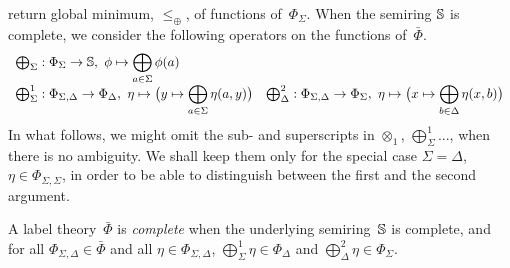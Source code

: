 return global minimum, \wrt $\leq_\oplus$, of functions of~$\Phi_\Sigma$.
%
When the semiring $\mathbb{S}$ is complete, we
consider the following operators on the functions of~$\bar\Phi$. %
\[
\begin{array}{ll}
\bigoplus_\Sigma : \Phi_\Sigma \to \mathbb{S},\
  \phi \mapsto \displaystyle\bigoplus_{a \in \Sigma} \phi(a)\\
\bigoplus^1_\Sigma :
  \Phi_{\Sigma,\Delta} \to \Phi_\Delta,\
  \eta \mapsto \bigl( y \mapsto \displaystyle\bigoplus_{a \in \Sigma} \eta(a, y) \bigr) &
\bigoplus^2_\Delta :
  \Phi_{\Sigma,\Delta} \to \Phi_\Sigma,\
  \eta \mapsto \bigl( x \mapsto \displaystyle\bigoplus_{b \in \Delta} \eta(x, b) \bigr)\\
\end{array}
\]
%
\medskip\noindent
In what follows, we might omit the sub- and superscripts in
$\otimes_1$, $\bigoplus^1_\Sigma$...,
when there is no ambiguity.
We shall keep them only for the special case $\Sigma = \Delta$,
\ie $\eta \in \Phi_{\Sigma, \Sigma}$, %
in order to be able to distinguish between the first and the second argument.
%
\begin{definition}\label{def:label-th-complete}
A label theory~$\bar\Phi$ is \emph{complete} when
the underlying semiring~$\mathbb{S}$ is complete, and
for all $\Phi_{\Sigma, \Delta} \in \bar\Phi$
and all $\eta \in \Phi_{\Sigma, \Delta}$,
$\bigoplus^1_\Sigma \eta \in \Phi_{\Delta}$ and
$\bigoplus^2_\Delta \eta \in \Phi_{\Sigma}$.
\end{definition}
%

